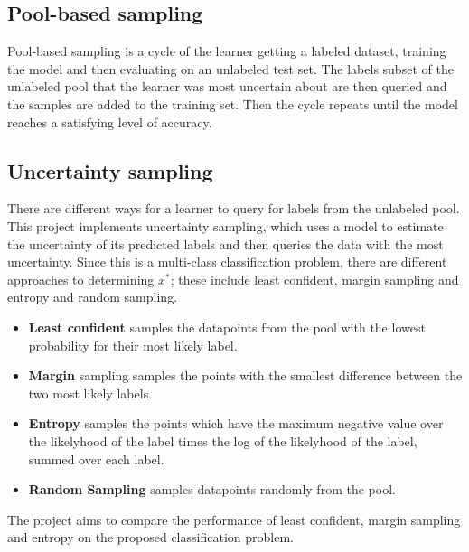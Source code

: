 \documentclass[12pt,fleqn]{article}
\begin{document}
\begin{multicols}{2}
		
		\subsection{Pool-based sampling}
		Pool-based sampling is a cycle of the learner getting a labeled dataset, training the model and then evaluating on an unlabeled test set. The labels subset of the unlabeled pool that the learner was most uncertain about are then queried and the samples are added to the training set. Then the cycle repeats until the model reaches a satisfying level of accuracy.  
		
		\subsection{Uncertainty sampling}
		There are different ways for a learner to query for labels from the unlabeled pool. This project implements uncertainty sampling, which uses a model to estimate the uncertainty of its predicted labels and then queries the data with the most uncertainty. Since this is a multi-class classification problem, there are different approaches to determining $x^*$; these include least confident, margin sampling and entropy and random sampling. 
		
		\begin{itemize}
			\item \textbf{Least confident} samples the datapoints from the pool with the lowest probability for their most likely label.
			\item \textbf{Margin} sampling samples the points with the smallest difference between the two most likely labels.
			\item \textbf{Entropy} samples the points which have the maximum negative value over the likelyhood of the label times the log of the likelyhood of the label, summed over each label.
			\item \textbf{Random Sampling} samples datapoints randomly from the pool.
		\end{itemize}
		 
		The project aims to compare the performance of least confident, margin sampling and entropy on the proposed classification problem. 
		 
	\end{multicols}		
\end{document}
